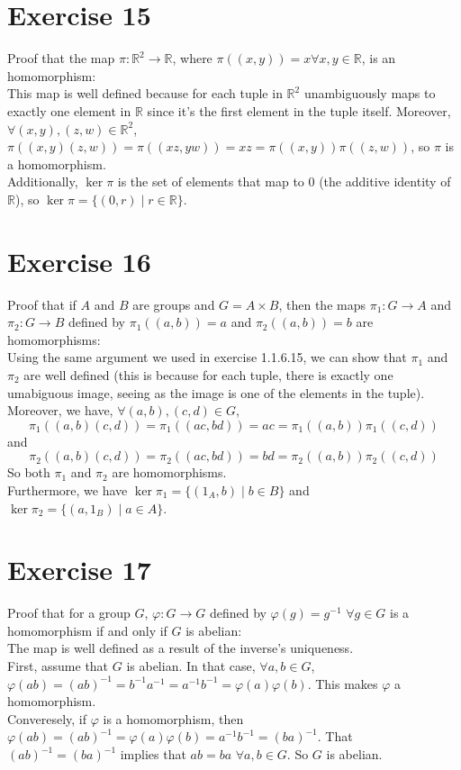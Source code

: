 \documentclass{article}
\newcommand{\R}{\mathbb{R}}
\begin{document}
    \section*{Exercise 15}
    Proof that the map $\pi: \R^2 \to \R$,
    where $\pi((x, y)) = x \forall x, y \in \R$, is an homomorphism: \\
    This map is well defined because for each tuple in $\R^2$
    unambiguously maps to exactly one element in $\R$
    since it's the first element in the tuple itself.
    Moreover, $\forall (x, y), (z, w) \in \R^2$,
    $\pi((x, y)(z, w)) = \pi((xz, yw)) = xz = \pi((x, y))\pi((z, w))$,
    so $\pi$ is a homomorphism. \\
    Additionally, $\ker \pi$ is the set of elements that map to $0$
    (the additive identity of $\R$),
    so $\ker \pi = \{(0, r) \mid r \in \R\}$.                                                       


    \section*{Exercise 16}
    Proof that if $A$ and $B$ are groups and $G = A \times B$,
    then the maps $\pi_1: G \to A$ and $\pi_2: G \to B$ defined by
    $\pi_1((a, b)) = a$ and $\pi_2((a, b)) = b$ are homomorphisms: \\
    Using the same argument we used in exercise 1.1.6.15,
    we can show that $\pi_1$ and $\pi_2$ are well defined
    (this is because for each tuple, there is exactly one umabiguous image,
    seeing as the image is one of the elements in the tuple).\\
    Moreover, we have, $\forall (a, b), (c, d) \in G$,
    \[ \pi_1((a, b)(c, d)) = \pi_1((ac, bd))
    = ac
    = \pi_1((a, b))\pi_1((c, d)) \]
    and
    \[ \pi_2((a, b)(c, d)) = \pi_2((ac, bd))
    = bd
    = \pi_2((a, b))\pi_2((c, d)) \]
    So both $\pi_1$ and $\pi_2$ are homomorphisms. \\
    Furthermore, we have $\ker \pi_1 = \{(1_A, b) \mid b \in B\}$
    and $\ker \pi_2 = \{(a, 1_B) \mid a \in A\}$.


    \section*{Exercise 17}
    Proof that for a group $G$, $\varphi: G \to G$
    defined by $\varphi(g) = g^{-1}$ $\forall g \in G$
    is a homomorphism if and only if $G$ is abelian: \\
    The map is well defined as a result of the inverse's uniqueness. \\
    First, assume that $G$ is abelian.
    In that case, $\forall a, b \in G$,
    $\varphi(ab) = (ab)^{-1} = b^{-1}a^{-1} 
    = a^{-1}b^{-1}
    = \varphi(a)\varphi(b)$.
    This makes $\varphi$ a homomorphism. \\
    Converesely, if $\varphi$ is a homomorphism,
    then $\varphi(ab) = (ab)^{-1}
    = \varphi(a)\varphi(b)
    = a^{-1}b^{-1} 
    = (ba)^{-1}$.
    That $(ab)^{-1} = (ba)^{-1}$ implies that $ab = ba$ $\forall a, b \in G$.
    So $G$ is abelian.
\end{document}
